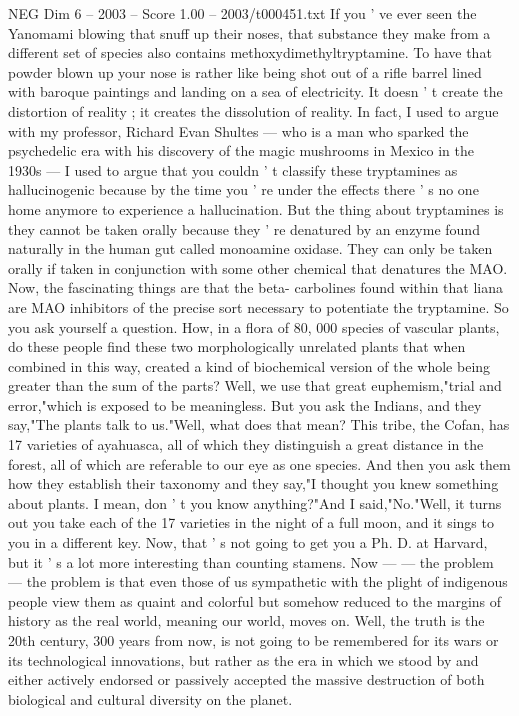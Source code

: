 \begin{textsample}{NEG Dim 6 – 2003 – Score 1.00 – 2003/t000451.txt}
If you ' ve ever seen the Yanomami blowing that snuff up their noses, that substance they make from a different set of species also contains methoxydimethyltryptamine.
To have that powder blown up your nose is rather like being shot out of a rifle barrel lined with baroque paintings and landing on a sea of electricity.
It doesn ' t create the distortion of reality ; it creates the dissolution of reality.
In fact, I used to argue with my professor, Richard Evan Shultes — who is a man who sparked the psychedelic era with his discovery of the magic mushrooms in Mexico in the 1930s — I used to argue that you couldn ' t classify these tryptamines as hallucinogenic because by the time you ' re under the effects there ' s no one home anymore to experience a hallucination.
But the thing about tryptamines is they cannot be taken orally because they ' re denatured by an enzyme found naturally in the human gut called monoamine oxidase.
They can only be taken orally if taken in conjunction with some other chemical that denatures the MAO.
Now, the fascinating things are that the beta- carbolines found within that liana are MAO inhibitors of the precise sort necessary to potentiate the tryptamine.
So you ask yourself a question.
How, in a flora of 80, 000 species of vascular plants, do these people find these two morphologically unrelated plants that when combined in this way, created a kind of biochemical version of the whole being greater than the sum of the parts?
Well, we use that great euphemism,"trial and error,"which is exposed to be meaningless.
But you ask the Indians, and they say,"The plants talk to us."Well, what does that mean?
This tribe, the Cofan, has 17 varieties of ayahuasca, all of which they distinguish a great distance in the forest, all of which are referable to our eye as one species.
And then you ask them how they establish their taxonomy and they say,"I thought you knew something about plants.
I mean, don ' t you know anything?"And I said,"No."Well, it turns out you take each of the 17 varieties in the night of a full moon, and it sings to you in a different key.
Now, that ' s not going to get you a Ph.
D. at Harvard, but it ' s a lot more interesting than counting stamens.
Now — — the problem — the problem is that even those of us sympathetic with the plight of indigenous people view them as quaint and colorful but somehow reduced to the margins of history as the real world, meaning our world, moves on.
Well, the truth is the 20th century, 300 years from now, is not going to be remembered for its wars or its technological innovations, but rather as the era in which we stood by and either actively endorsed or passively accepted the massive destruction of both biological and cultural diversity on the planet.

\end{textsample}
